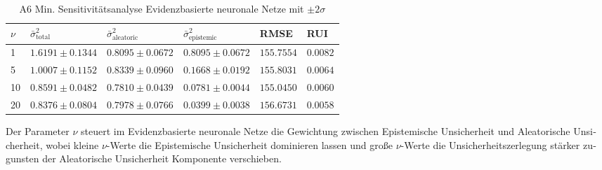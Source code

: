 \begin{otherlanguage}{ngerman}

\newline 

\begin{table}[!htbp]
\centering
\footnotesize
\begin{tabularx}{\textwidth}{|X|X|X|X|X|X|}
\hline
\vspace{0.15em}$\nu$\vspace{0.25em}
& \vspace{0.15em}$\bar{\sigma}^2_{\text{total}}$\vspace{0.25em}
& \vspace{0.15em}$\bar{\sigma}^2_{\text{aleatoric}}$\vspace{0.25em}
& \vspace{0.15em}$\bar{\sigma}^2_{\text{epistemic}}$\vspace{0.25em}
& \vspace{0.15em}RMSE\vspace{0.25em}
& \vspace{0.15em}RUI\vspace{0.25em} \\
\hline
1  & $1.6191 \pm 0.1344$ & $0.8095 \pm 0.0672$ & $0.8095 \pm 0.0672$ & $155.7554$ & $0.0082$ \\
\hline
5  & $1.0007 \pm 0.1152$ & $0.8339 \pm 0.0960$ & $0.1668 \pm 0.0192$ & $155.8031$ & $0.0064$ \\
\hline
10 & $0.8591 \pm 0.0482$ & $0.7810 \pm 0.0439$ & $0.0781 \pm 0.0044$ & $155.0450$ & $0.0060$ \\
\hline
20 & $0.8376 \pm 0.0804$ & $0.7978 \pm 0.0766$ & $0.0399 \pm 0.0038$ & $156.6731$ & $0.0058$ \\
\hline
\end{tabularx}
\caption{A6 Min. Sensitivitätsanalyse \gls{Evidenzbasierte neuronale Netze} mit $\pm 2\sigma$}
\label{tab:enn_results}
\end{table}

Der Parameter $\nu$ steuert im \gls{Evidenzbasierte neuronale Netze} die Gewichtung zwischen \gls{Epistemische Unsicherheit} und \gls{Aleatorische Unsicherheit}, wobei kleine $\nu$-Werte die \gls{Epistemische Unsicherheit} dominieren lassen und große $\nu$-Werte die Unsicherheitszerlegung stärker zugunsten der \gls{Aleatorische Unsicherheit} Komponente verschieben.


\end{otherlanguage}

